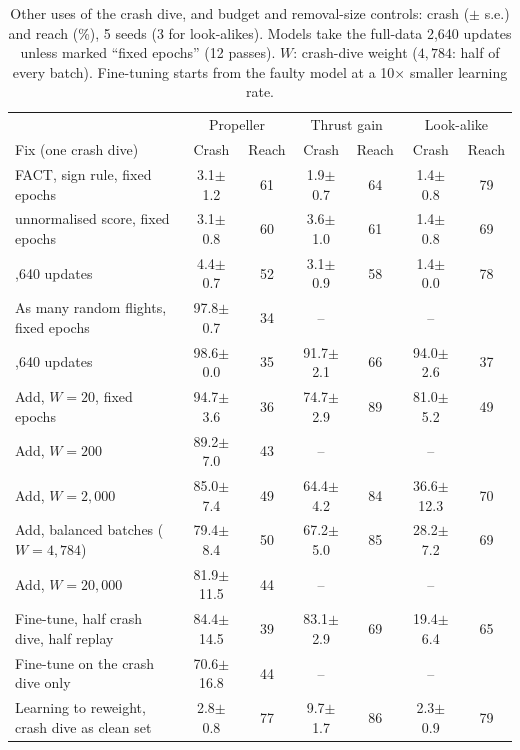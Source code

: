\documentclass[preprint,12pt]{elsarticle}
\newcommand{\method}{FACT}
\newcommand{\pmse}[2]{#1{\scriptsize$\pm$#2}}
\begin{document}
\begin{table}[t]
\caption{Other uses of the crash dive, and budget and removal-size controls: crash ($\pm$ s.e.) and reach (\%), 5 seeds (3 for look-alikes). Models take the full-data 2,640 updates unless marked ``fixed epochs'' (12 passes). $W$: crash-dive weight ($4{,}784$: half of every batch). Fine-tuning starts from the faulty model at a 10$\times$ smaller learning rate.}
\label{tab:reweight}
\centering\footnotesize
\setlength{\tabcolsep}{2.5pt}
\begin{tabular}{@{}lcccccc@{}}
\toprule
 & \multicolumn{2}{c}{Propeller} & \multicolumn{2}{c}{Thrust gain} & \multicolumn{2}{c}{Look-alike} \\
Fix (one crash dive) & Crash & Reach & Crash & Reach & Crash & Reach \\
\midrule
\method{}, sign rule, fixed epochs & \pmse{3.1}{1.2} & 61 & \pmse{1.9}{0.7} & 64 & \pmse{1.4}{0.8} & 79 \\
\quad unnormalised score, fixed epochs & \pmse{3.1}{0.8} & 60 & \pmse{3.6}{1.0} & 61 & \pmse{1.4}{0.8} & 69 \\
\quad 2,640 updates & \pmse{4.4}{0.7} & 52 & \pmse{3.1}{0.9} & 58 & \pmse{1.4}{0.0} & 78 \\
As many random flights, fixed epochs & \pmse{97.8}{0.7} & 34 & -- & & -- & \\
\quad 2,640 updates & \pmse{98.6}{0.0} & 35 & \pmse{91.7}{2.1} & 66 & \pmse{94.0}{2.6} & 37 \\
\midrule
Add, $W=20$, fixed epochs & \pmse{94.7}{3.6} & 36 & \pmse{74.7}{2.9} & 89 & \pmse{81.0}{5.2} & 49 \\
Add, $W=200$ & \pmse{89.2}{7.0} & 43 & -- & & -- & \\
Add, $W=2{,}000$ & \pmse{85.0}{7.4} & 49 & \pmse{64.4}{4.2} & 84 & \pmse{36.6}{12.3} & 70 \\
Add, balanced batches ($W=4{,}784$) & \pmse{79.4}{8.4} & 50 & \pmse{67.2}{5.0} & 85 & \pmse{28.2}{7.2} & 69 \\
Add, $W=20{,}000$ & \pmse{81.9}{11.5} & 44 & -- & & -- & \\
Fine-tune, half crash dive, half replay & \pmse{84.4}{14.5} & 39 & \pmse{83.1}{2.9} & 69 & \pmse{19.4}{6.4} & 65 \\
Fine-tune on the crash dive only & \pmse{70.6}{16.8} & 44 & -- & & -- & \\
Learning to reweight, crash dive as clean set & \pmse{2.8}{0.8} & 77 & \pmse{9.7}{1.7} & 86 & \pmse{2.3}{0.9} & 79 \\
\bottomrule
\end{tabular}
\end{table}
\end{document}
